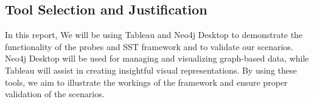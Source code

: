 \subsection{Tool Selection and Justification}

In this report, We will be using Tableau and Neo4j Desktop to demonstrate the functionality of the probes and SST framework and to validate our scenarios. Neo4j Desktop will be used for managing and visualizing graph-based data, while Tableau will assist in creating insightful visual representations. By using these tools, we aim to illustrate the workings of the framework and ensure proper validation of the scenarios.